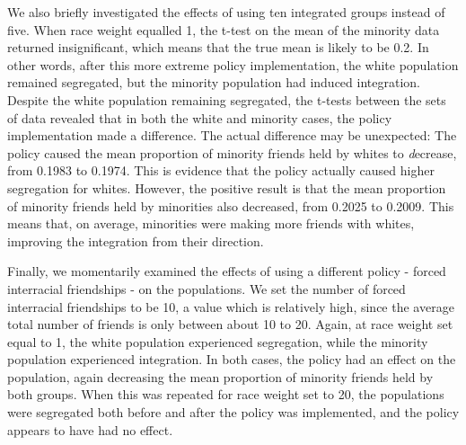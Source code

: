 We also briefly investigated the effects of using ten integrated groups instead of five. When race weight equalled 1, the 
t-test on the mean of the minority data returned insignificant, which means that the true mean is likely to be 0.2. In other 
words, after this more extreme policy implementation, the white population remained segregated, but the minority population 
had induced integration. Despite the white population remaining segregated, the t-tests between the sets of data revealed 
that in both the white and minority cases, the policy implementation made a difference. The actual difference may 
be unexpected: The policy caused the mean proportion of minority friends held by whites to {\emph decrease}, from 0.1983 to 
0.1974. This is evidence that the policy actually caused higher segregation for whites. However, the positive result is that 
the mean proportion of minority friends held by minorities also decreased, from 0.2025 to 0.2009. This means that, on 
average, minorities were making more friends with whites, improving the integration from their direction.


Finally, we momentarily examined the effects of using a different policy - forced interracial friendships - on the 
populations. We set the number of forced interracial friendships to be 10, a value which is relatively high, since the average 
total number of friends is only between about 10 to 20. Again, at race weight set equal to 1, the white population 
experienced segregation, while the minority population experienced integration. In both cases, the policy had an effect on the 
population, again decreasing the mean proportion of minority friends held by both groups. When this was repeated for race 
weight set to 20, the populations were segregated both before and after the policy was implemented, and the policy appears 
to have had no effect.

